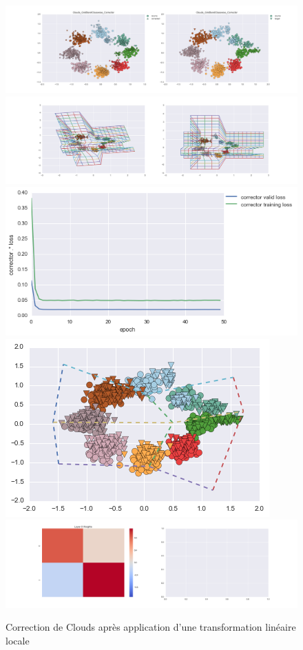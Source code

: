 \begin{figure}[H] %
\centering
\includegraphics[width=\linewidth]{fig/24-05-2016/clouds/Clouds_GridBendClasswise_Corrector-DATA.png}
\includegraphics[width=\linewidth]{fig/24-05-2016/clouds/Clouds_GridBendClasswise_Corrector-GridCheck.png}
\includegraphics[width=0.45\linewidth]{fig/24-05-2016/clouds/Clouds_GridBendClasswise_Corrector-Learning_curve.png}
\includegraphics[width=0.45\linewidth]{fig/24-05-2016/clouds/cloud_grid.png}
\includegraphics[width=\linewidth]{fig/24-05-2016/clouds/Clouds_GridBendClasswise_Corrector-W.png}
\caption{Correction de Clouds après application d'une transformation linéaire locale}
\label{fig:recap-clouds-GridBend-classwise}
\end{figure}


